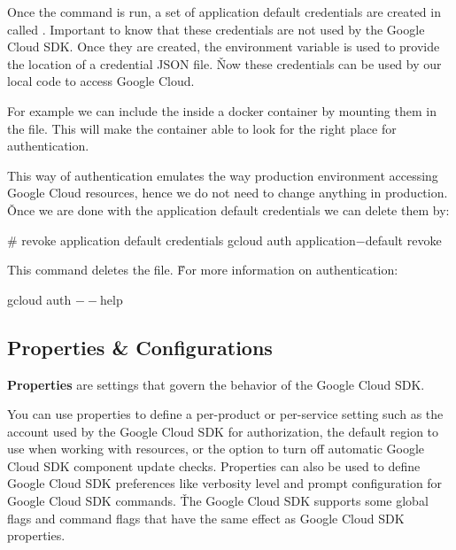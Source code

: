 Once the command is run, a set of application default credentials are created in 
called . Important to know that these credentials are not used by the
Google Cloud SDK. Once they are created, the  environment variable is used to
provide the location of a credential JSON file. \v

Now these credentials can be used by our local code to access Google Cloud.

\be
For example we can include the  inside a docker container by mounting them
in the  file. This will make the container able to look for the right place for authentication.
\ee

This way of authentication emulates the way production environment accessing Google Cloud resources, hence we do not
need to change anything in production. \v

Once we are done with the application default credentials we can delete them by:
\begin{bash}
# revoke application default credentials
gcloud auth application$-$default revoke
\end{bash}

This command deletes the  file. \v

For more information on authentication:
\begin{bash}
gcloud auth $--$help
\end{bash}

\subsection{Properties \& Configurations}

\bd[Properties]
\textbf{Properties} are settings that govern the behavior of the Google Cloud SDK\@.
\ed

You can use properties to define a per-product or per-service setting such as the account used by the Google Cloud SDK
for authorization, the default region to use when working with resources, or the option to turn off automatic Google
Cloud SDK component update checks. Properties can also be used to define Google Cloud SDK preferences like verbosity
level and prompt configuration for Google Cloud SDK commands. \v

The Google Cloud SDK supports some global flags and command flags that have the same effect as Google Cloud SDK
properties.


